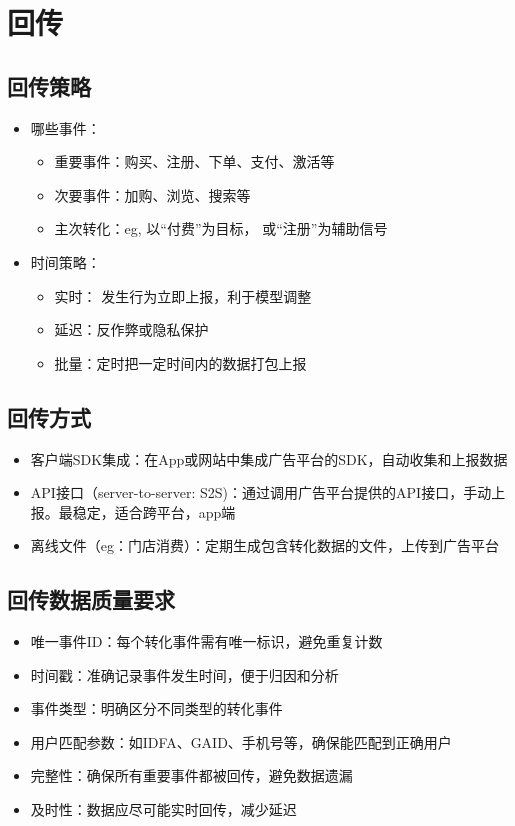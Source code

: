 \documentclass{article}
\begin{document}
\section{回传}

\subsection{回传策略}
\begin{itemize}
    \item 哪些事件：
    \begin{itemize}
        \item 重要事件：购买、注册、下单、支付、激活等
        \item 次要事件：加购、浏览、搜索等
        \item 主次转化：eg, 以“付费”为目标， 或“注册”为辅助信号
        \end{itemize}
    \item 时间策略：
    \begin{itemize}
        \item 实时： 发生行为立即上报，利于模型调整
        \item 延迟：反作弊或隐私保护
        \item 批量：定时把一定时间内的数据打包上报
    \end{itemize}
\end{itemize}

\subsection{回传方式}
\begin{itemize}
    \item 客户端SDK集成：在App或网站中集成广告平台的SDK，自动收集和上报数据
    \item API接口（server-to-server: S2S)：通过调用广告平台提供的API接口，手动上报。最稳定，适合跨平台，app端
    \item 离线文件（eg：门店消费）：定期生成包含转化数据的文件，上传到广告平台
\end{itemize}

\subsection{回传数据质量要求}
\begin{itemize}
    \item 唯一事件ID：每个转化事件需有唯一标识，避免重复计数
    \item 时间戳：准确记录事件发生时间，便于归因和分析
    \item 事件类型：明确区分不同类型的转化事件
    \item 用户匹配参数：如IDFA、GAID、手机号等，确保能匹配到正确用户
    \item 完整性：确保所有重要事件都被回传，避免数据遗漏
    \item 及时性：数据应尽可能实时回传，减少延迟
\end{itemize}
\end{document}
